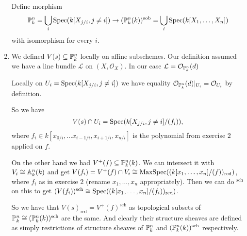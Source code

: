 \begin{exercise}{3}
\begin{enumerate}
{            Define morphism
            \begin{equation*}
                \mathbb{P}^n_k = \bigcup_i \operatorname{Spec}(k[X_{j/i}, j \not= i]) \to
                (\mathbb{P}^n_k(k))^{\text{sob}} = \bigcup_i \operatorname{Spec}(k[X_1, \dots, X_n])
            \end{equation*}
            with isomorphism for every $i$.
            }

        \item{
                We defined $V(s) \subseteq \mathbb{P}^n_k$ locally on affine
                subschemes. Our definition assumed we have a line bundle
                $\mathcal{L}$ on $(X, \mathcal{O}_X)$. In our case $\mathcal{L}
                = \mathcal{O}_{\mathbb{P}^n_k}(d)$

                Locally on $U_i = \operatorname{Spec}(k[X_{j/i}, j \not= i])$ we have equality
                $\mathcal{O}_{\mathbb{P}^n_k}(d)|_{U_i} = \mathcal{O}_{U_i}$ by
                definition.

                So we have
                \begin{equation*}
                    V(s) \cap U_i = \operatorname{Spec}(k[X_{j/i}, j \not= i] / (f_i)),
                \end{equation*}
                where $f_i \in k[x_{0/i}, \dots x_{i-1/i}, x_{i+1/i}, x_{n/i}]$
                is the polynomial from exercise $2$ applied on $f$.

                On the other hand we had $V^+(f) \subseteq \mathbb{P}^n_k(k)$. We can
                intersect it with $V_i \cong \mathbb{A}^n_k(k)$ and get $V(f_i) =
                V^+(f) \cap V_i \cong \operatorname{MaxSpec}((k[x_1, \dots,
                x_n]/(f))_{\text{red}})$, where $f_i$ as in exercise $2$ (rename
                $x_1, \dots, x_n$ appropriately). Then we can do $^{\text{sch}}$
                on this to get $(V(f_i))^{\text{sch}} \cong \operatorname{Spec}((k[x_1, \dots,
                x_n]/(f_i))_{\text{red}})$.

                So we have that $V(s)_{\text{red}} = V^+(f)^{\text{sch}}$ as
                topological subsets of $\mathbb{P}^n_k \cong
                (\mathbb{P}^n_k(k))^{\text{sch}}$ are the same. And clearly their
                structure sheaves are defined as simply restrictions of
                structure sheaves of $\mathbb{P}^n_k$ and
                $(\mathbb{P}^n_k(k))^{\text{sch}}$ respectively.
            }
    \end{enumerate}
\end{exercise}

